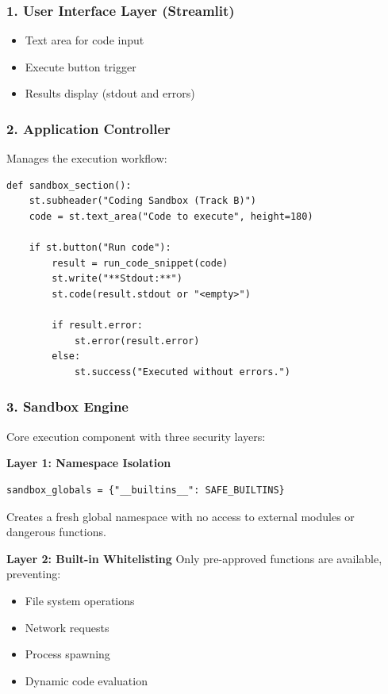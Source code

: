 \documentclass[12pt,a4paper]{article}
\begin{document}
\subsubsection{1. User Interface Layer (Streamlit)}
\begin{itemize}
    \item Text area for code input
    \item Execute button trigger
    \item Results display (stdout and errors)
\end{itemize}

\subsubsection{2. Application Controller}
Manages the execution workflow:

\begin{lstlisting}[caption=Streamlit Sandbox Section]
def sandbox_section():
    st.subheader("Coding Sandbox (Track B)")
    code = st.text_area("Code to execute", height=180)
    
    if st.button("Run code"):
        result = run_code_snippet(code)
        st.write("**Stdout:**")
        st.code(result.stdout or "<empty>")
        
        if result.error:
            st.error(result.error)
        else:
            st.success("Executed without errors.")
\end{lstlisting}

\subsubsection{3. Sandbox Engine}
Core execution component with three security layers:

\textbf{Layer 1: Namespace Isolation}
\begin{verbatim}
sandbox_globals = {"__builtins__": SAFE_BUILTINS}
\end{verbatim}
Creates a fresh global namespace with no access to external modules or dangerous functions.

\textbf{Layer 2: Built-in Whitelisting}
Only pre-approved functions are available, preventing:
\begin{itemize}
    \item File system operations
    \item Network requests
    \item Process spawning
    \item Dynamic code evaluation
\end{itemize}
\end{document}
